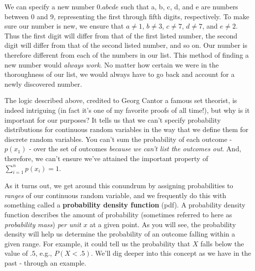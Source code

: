 \documentclass[
]{book}
\theoremstyle{definition}
\theoremstyle{definition}
\theoremstyle{definition}
\theoremstyle{definition}
\theoremstyle{remark}
\begin{document}
We can specify a new number \(0.abcde\) such that a, b, c, d, and e are numbers between 0 and 9, representing the first through fifth digits, respectively. To make sure our number is new, we ensure that \(a \neq 1\), \(b \neq 3\), \(c \neq 7\), \(d \neq 7\), and \(e \neq 2\). Thus the first digit will differ from that of the first listed number, the second digit will differ from that of the second listed number, and so on. Our number is therefore different from each of the numbers in our list. This method of finding a new number would \emph{always work}. No matter how certain we were in the thoroughness of our list, we would always have to go back and account for a newly discovered number.

The logic described above, credited to Georg Cantor a famous set theorist, is indeed intriguing (in fact it's one of my favorite proofs of all time!), but why is it important for our purposes? It tells us that we can't specify probability distributions for continuous random variables in the way that we define them for discrete random variables. You can't sum the probability of each outcome - \(p(x_1)\) - over the set of outcomes \emph{because we can't list the outcomes out}. And, therefore, we can't ensure we've attained the important property of \(\sum_{i = 1}^{n} p(x_i) = 1\).

As it turns out, we get around this conundrum by assigning probabilities to \emph{ranges} of our continuous random variable, and we frequently do this with something called a \textbf{probability density function} (pdf). A probability density function describes the amount of probability (sometimes referred to here as \emph{probability mass}) \emph{per unit} \(x\) at a given point. As you will see, the probability density will help us determine the probability of an outcome falling within a given range. For example, it could tell us the probability that \(X\) falls below the value of \(.5\), e.g., \(P(X < .5)\). We'll dig deeper into this concept as we have in the past - through an example.
\end{document}

